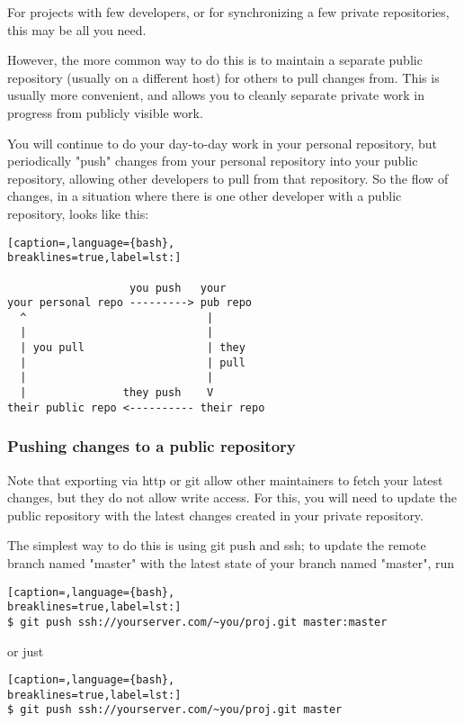 For projects with few developers, or for synchronizing a few private
repositories, this may be all you need.

However, the more common way to do this is to maintain a separate public
repository (usually on a different host) for others to pull changes from. This
is usually more convenient, and allows you to cleanly separate private work in
progress from publicly visible work.

You will continue to do your day-to-day work in your personal repository, but
periodically "push" changes from your personal repository into your public
repository, allowing other developers to pull from that repository. So the flow
of changes, in a situation where there is one other developer with a public
repository, looks like this:
\lstset{basicstyle=\scriptsize, numbers=none, captionpos=b, tabsize=4}
\begin{lstlisting}[caption=,language={bash},
breaklines=true,label=lst:]

                   you push   your
your personal repo ---------> pub repo
  ^                            |
  |                            |
  | you pull                   | they
  |                            | pull
  |                            |
  |               they push    V
their public repo <---------- their repo
\end{lstlisting}

\subsubsection{Pushing changes to a public repository}
Note that exporting via http or git allow other maintainers to fetch your
latest changes, but they do not allow write access. For this, you will need to
update the public repository with the latest changes created in your private
repository.

The simplest way to do this is using git push and ssh; to update the remote
branch named "master" with the latest state of your branch named "master", run
\lstset{basicstyle=\scriptsize, numbers=none, captionpos=b, tabsize=4}
\begin{lstlisting}[caption=,language={bash},
breaklines=true,label=lst:]
$ git push ssh://yourserver.com/~you/proj.git master:master
\end{lstlisting}

or just
\lstset{basicstyle=\scriptsize, numbers=none, captionpos=b, tabsize=4}
\begin{lstlisting}[caption=,language={bash},
breaklines=true,label=lst:]
$ git push ssh://yourserver.com/~you/proj.git master
\end{lstlisting}

